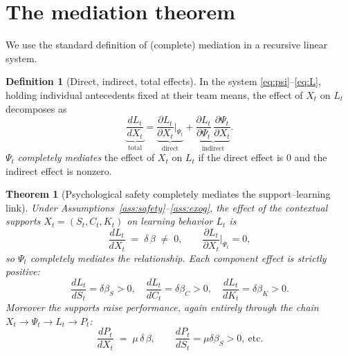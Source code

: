 \documentclass{amsart}
\newtheorem{theorem}{Theorem}
\theoremstyle{definition}
\newtheorem{definition}{Definition}
\theoremstyle{remark}
\begin{document}
\section{The mediation theorem}

We use the standard definition of (complete) mediation in a recursive
linear system.

\begin{definition}[Direct, indirect, total effects]\label{def:effects}
In the system \eqref{eq:psi}--\eqref{eq:L}, holding individual antecedents
fixed at their team means, the effect of $X_t$ on $L_t$ decomposes as
\[
\underbrace{\frac{dL_t}{dX_t}}_{\text{total}}
=\underbrace{\frac{\partial L_t}{\partial X_t}\Big|_{\Psi_t}}_{\text{direct}}
+\underbrace{\frac{\partial L_t}{\partial \Psi_t}\,\frac{\partial \Psi_t}{\partial X_t}}_{\text{indirect}} .
\]
$\Psi_t$ \emph{completely mediates} the effect of $X_t$ on $L_t$ if the
direct effect is $0$ and the indirect effect is nonzero.
\end{definition}

\begin{theorem}[Psychological safety completely mediates the support--learning link]%
\label{thm:main}
Under Assumptions~\ref{ass:safety}--\ref{ass:exog}, the effect of the
contextual supports $X_t=(S_t,C_t,K_t)$ on learning behavior $L_t$ is
\begin{equation}\label{eq:decomp}
\frac{dL_t}{dX_t} \;=\; \delta\,\beta \;\neq\; 0,
\qquad
\frac{\partial L_t}{\partial X_t}\Big|_{\Psi_t}=0,
\end{equation}
so $\Psi_t$ completely mediates the relationship. Each component effect is
strictly positive:
\[
\frac{dL_t}{dS_t}=\delta\beta_S>0,\quad
\frac{dL_t}{dC_t}=\delta\beta_C>0,\quad
\frac{dL_t}{dK_t}=\delta\beta_K>0.
\]
Moreover the supports raise performance, again entirely through the chain
$X_t\to\Psi_t\to L_t\to P_t$:
\begin{equation}\label{eq:perfchain}
\frac{dP_t}{dX_t} \;=\; \mu\,\delta\,\beta,\qquad
\frac{dP_t}{dS_t}=\mu\delta\beta_S>0,\ \text{etc.}
\end{equation}
\end{theorem}
\end{document}
